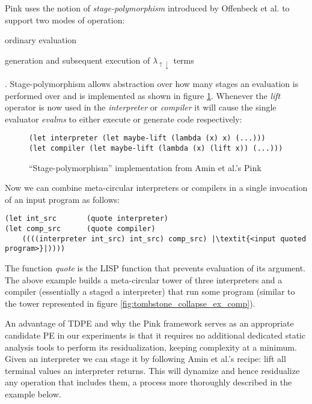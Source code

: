 \documentclass[a4paper,12pt,twoside,openright]{report}
\theoremstyle{definition}
\newcommand{\mslang}{$\lambda_{\uparrow\downarrow}$}
\begin{document}
Pink uses the notion of \textit{stage-polymorphism} introduced by Offenbeck et al. \cite{ofenbeck2017staging} to support two modes of operation:
\begin{enumerate*}[label=(\arabic*)]
	\item ordinary evaluation
	\item generation and subsequent execution of \mslang{} terms
\end{enumerate*}.
Stage-polymorphism allows abstraction over how many stages an evaluation is performed over and is implemented as shown in figure \ref{lst:stage_poly_impl}. Whenever the \textit{lift} operator is now used in the \textit{interpreter} or \textit{compiler} it will cause the single evaluator \textit{evalms} to either execute or generate code respectively:

\begin{figure}[ht]
\centering
\begin{verbatim}
(let interpreter (let maybe-lift (lambda (x) x) (...)))
(let compiler (let maybe-lift (lambda (x) (lift x)) (...)))
\end{verbatim}
\caption{``Stage-polymorphism'' implementation from Amin et al.'s Pink \cite{amin2017collapsing}}
\label{lst:stage_poly_impl}
\end{figure}

Now we can combine meta-circular interpreters or compilers in a single invocation of an input program as follows:
\begin{verbatim}
(let int_src       (quote interpreter)
(let comp_src      (quote compiler)
    ((((interpreter int_src) int_src) comp_src) |\textit{<input quoted program>}|))))
\end{verbatim}
The function \textit{quote} is the LISP function that prevents evaluation of its argument. The above example builds a meta-circular tower of three interpreters and a compiler (essentially a staged a interpreter) that run some program (similar to the tower represented in figure \ref{fig:tombstone_collapse_ex_comp}).

An advantage of TDPE and why the Pink framework serves as an appropriate candidate PE in our experiments is that it requires no additional dedicated static analysis tools to perform its residualization, keeping complexity at a minimum. Given an interpreter we can stage it by following Amin et al.'s \cite{amin2017collapsing} recipe: lift all terminal values an interpreter returns. This will dynamize and hence residualize any operation that includes them, a process more thoroughly described in the example below.
\end{document}
